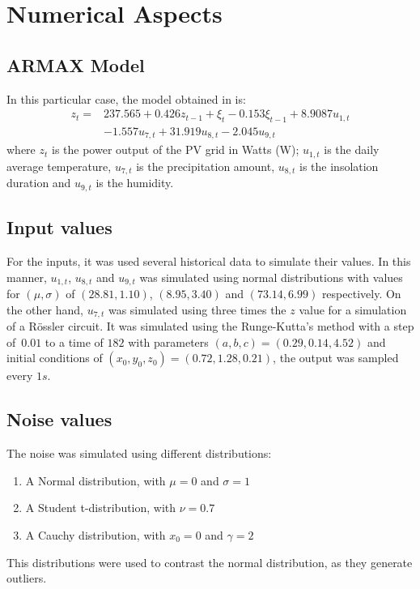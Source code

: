\section{Numerical Aspects}\label{sec:numAsp}
\subsection{ARMAX Model}
In this particular case, the model obtained in \cite{li2014armax} is:
\begin{equation}
\begin{aligned} z_{t}=& 237.565+0.426z_{t-1}+\xi_{t}-0.153 \xi_{t-1}+8.9087u_{1, t} \\ &-1.557 u_{7, t}+31.919 u_{8, t}-2.045u_{9, t}
\end{aligned}
\end{equation}
where $z_t$ is the power output of the PV grid in Watts (W); $u_{1,t}$ is the daily average temperature, $u_{7,t}$ is the precipitation amount, $u_{8,t}$ is the insolation duration and $u_{9,t}$ is the humidity.

\subsection{Input values}
For the inputs, it was used several historical data to simulate their values. In this manner, $u_{1,t}$, $u_{8,t}$ and $u_{9,t}$ was simulated using normal distributions with values for $(\mu, \sigma)$ of $(28.81, 1.10)$, $(8.95, 3.40)$ and $(73.14, 6.99)$ respectively. On the other hand, $u_{7,t}$ was simulated using three times the $z$ value for a simulation of a Rössler circuit. It was simulated using the Runge-Kutta's method with a step of~$0.01$ to a time of $182$ with parameters $(a, b, c) = (0.29, 0.14, 4.52)$ and initial conditions of $(x_0, y_0, z_0) = (0.72, 1.28, 0.21)$, the output was sampled every $1s$.

\subsection{Noise values}
The noise was simulated using different distributions:
\begin{enumerate}
  \item A Normal distribution, with $\mu = 0$ and $\sigma = 1$
  \item A Student t-distribution, with $\nu = 0.7$
  \item A Cauchy distribution, with $x_0 = 0$ and $\gamma = 2$
  \end{enumerate}

This distributions were used to contrast the normal distribution, as they generate outliers.
